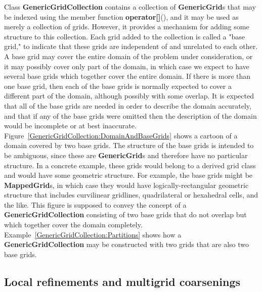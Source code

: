 \documentclass{article}
\begin{document}
Class \textbf{GenericGridCollection} contains a collection of \textbf{GenericGrid}s that may be indexed using the member function
\textbf{operator[]}(), and it may be used as merely a collection of grids.  However, it provides a mechanism for
adding some structure to this collection.  Each grid added to the collection is called a "base grid," to indicate that these grids are
independent of and unrelated to each other.  A base grid may cover the entire domain of the problem under consideration, or it may possibly
cover only part of the domain, in which case we expect to have several base grids which together cover the entire domain.  If there is more
than one base grid, then each of the base grids is normally expected to cover a different part of the domain, although possibly with some
overlap.  It is expected that all of the base grids are needed in order to describe the domain accurately, and that if any of the base grids
were omitted then the description of the domain would be incomplete or at best inaccurate.  Figure~\ref{GenericGridCollection:DomainAndBaseGrids}
shows a cartoon of a domain covered by two base grids.  The structure of the base grids is intended to be ambiguous, since these are
\textbf{GenericGrid}s and therefore have no particular structure.  In a concrete example, these grids would belong to a derived
grid class and would have some geometric structure.  For example, the base grids might be \textbf{MappedGrid}s, in which case they would
have logically-rectangular geometric structure that includes curvilinear gridlines, quadrilateral or hexahedral cells, and the like.
This figure is supposed to convey the concept of a \textbf{GenericGridCollection} consisting of two base grids that do not overlap
but which together cover the domain completely.  Example~\ref{GenericGridCollection:Partitions} shows how a \textbf{GenericGridCollection}
may be constructed with two grids that are also two base grids.

\subsection{Local refinements and multigrid coarsenings}
\label{GenericGridCollection:RefinementsAndCoarsenings}
\end{document}
